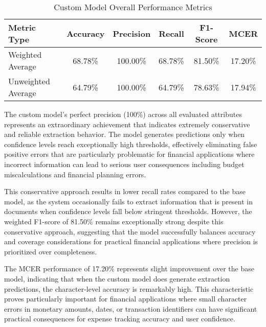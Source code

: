 \begin{table}[htbp]
\centering
\caption{Custom Model Overall Performance Metrics}
\label{tab:custom-model-results}
\begin{tabular}{|l|c|c|c|c|c|}
\hline
\textbf{Metric Type} & \textbf{Accuracy} & \textbf{Precision} & \textbf{Recall} & \textbf{F1-Score} & \textbf{MCER} \\
\hline
Weighted Average & 68.78\% & 100.00\% & 68.78\% & 81.50\% & 17.20\% \\
Unweighted Average & 64.79\% & 100.00\% & 64.79\% & 78.63\% & 17.94\% \\
\hline
\end{tabular}
\end{table}

The custom model's perfect precision (100\%) across all evaluated attributes represents an extraordinary achievement that indicates extremely conservative and reliable extraction behavior. The model generates predictions only when confidence levels reach exceptionally high thresholds, effectively eliminating false positive errors that are particularly problematic for financial applications where incorrect information can lead to serious user consequences including budget miscalculations and financial planning errors.

This conservative approach results in lower recall rates compared to the base model, as the system occasionally fails to extract information that is present in documents when confidence levels fall below stringent thresholds. However, the weighted F1-score of 81.50\% remains exceptionally strong despite this conservative approach, suggesting that the model successfully balances accuracy and coverage considerations for practical financial applications where precision is prioritized over completeness.

The MCER performance of 17.20\% represents slight improvement over the base model, indicating that when the custom model does generate extraction predictions, the character-level accuracy is remarkably high. This characteristic proves particularly important for financial applications where small character errors in monetary amounts, dates, or transaction identifiers can have significant practical consequences for expense tracking accuracy and user confidence.

